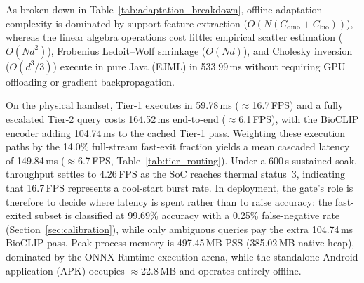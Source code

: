 As broken down in Table~\ref{tab:adaptation_breakdown}, offline adaptation complexity is dominated by support feature extraction ($O(N(C_{\text{dino}}+C_{\text{bio}}))$), whereas the linear algebra operations cost little: empirical scatter estimation ($O(Nd^2)$), Frobenius Ledoit--Wolf shrinkage ($O(Nd)$), and Cholesky inversion ($O(d^3/3)$) execute in pure Java (EJML) in 533.99\,ms without requiring GPU offloading or gradient backpropagation.

On the physical handset, Tier-1 executes in 59.78\,ms ($\approx$16.7\,FPS) and a fully escalated Tier-2 query costs 164.52\,ms end-to-end ($\approx$6.1\,FPS), with the BioCLIP encoder adding 104.74\,ms to the cached Tier-1 pass. Weighting these execution paths by the 14.0\% full-stream fast-exit fraction yields a mean cascaded latency of 149.84\,ms ($\approx$6.7\,FPS, Table~\ref{tab:tier_routing}). Under a 600\,s sustained soak, throughput settles to 4.26\,FPS as the SoC reaches thermal status~3, indicating that 16.7\,FPS represents a cool-start burst rate. In deployment, the gate's role is therefore to decide where latency is spent rather than to raise accuracy: the fast-exited subset is classified at 99.69\% accuracy with a 0.25\% false-negative rate (Section~\ref{sec:calibration}), while only ambiguous queries pay the extra 104.74\,ms BioCLIP pass. Peak process memory is 497.45\,MB PSS (385.02\,MB native heap), dominated by the ONNX Runtime execution arena, while the standalone Android application (APK) occupies $\approx$22.8\,MB and operates entirely offline.

